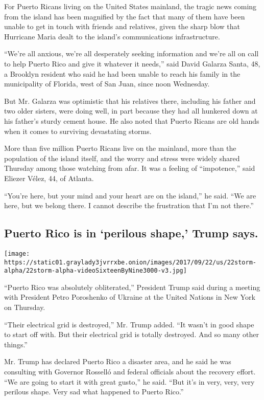 For Puerto Ricans living on the United States mainland, the tragic news
coming from the island has been magnified by the fact that many of them
have been unable to get in touch with friends and relatives, given the
sharp blow that Hurricane Maria dealt to the island's communications
infrastructure.

``We're all anxious, we're all desperately seeking information and we're
all on call to help Puerto Rico and give it whatever it needs,'' said
David Galarza Santa, 48, a Brooklyn resident who said he had been unable
to reach his family in the municipality of Florida, west of San Juan,
since noon Wednesday.

But Mr. Galarza was optimistic that his relatives there, including his
father and two older sisters, were doing well, in part because they had
all hunkered down at his father's sturdy cement house. He also noted
that Puerto Ricans are old hands when it comes to surviving devastating
storms.

More than five million Puerto Ricans live on the mainland, more than the
population of the island itself, and the worry and stress were widely
shared Thursday among those watching from afar. It was a feeling of
``impotence,'' said Eliezer Vélez, 44, of Atlanta.

``You're here, but your mind and your heart are on the island,'' he
said. ``We are here, but we belong there. I cannot describe the
frustration that I'm not there.''

\hypertarget{puerto-rico-is-in-perilous-shape-trump-says}{%
\subsection{Puerto Rico is in `perilous shape,' Trump
says.}\label{puerto-rico-is-in-perilous-shape-trump-says}}

\texttt{[image: https://static01.graylady3jvrrxbe.onion/images/2017/09/22/us/22storm-alpha/22storm-alpha-videoSixteenByNine3000-v3.jpg]}

``Puerto Rico was absolutely obliterated,'' President Trump said during
a meeting with President Petro Poroshenko of Ukraine at the United
Nations in New York on Thursday.

``Their electrical grid is destroyed,'' Mr. Trump added. ``It wasn't in
good shape to start off with. But their electrical grid is totally
destroyed. And so many other things.''

Mr. Trump has declared Puerto Rico a disaster area, and he said he was
consulting with Governor Rosselló and federal officials about the
recovery effort. ``We are going to start it with great gusto,'' he said.
``But it's in very, very, very perilous shape. Very sad what happened to
Puerto Rico.''

